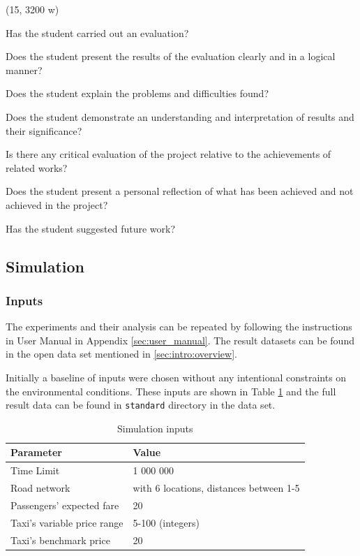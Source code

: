 (15, 3200 w)

Has the student carried out an evaluation?

Does the student present the results of the evaluation clearly and in a logical
manner?

Does the student explain the problems and difficulties found?

Does the student demonstrate an understanding and interpretation of results and
their significance?

Is there any critical evaluation of the project relative to the achievements of
related works?

Does the student present a personal reflection of what has been achieved and
not achieved in the project?

Has the student suggested future work?


\subsection{Simulation}
\label{sec:results}

\subsubsection{Inputs}

The experiments and their analysis can be repeated by following the
instructions in User Manual in Appendix \ref{sec:user_manual}. The result
datasets can be found in the open data set mentioned in
\ref{sec:intro:overview}.

Initially a baseline of inputs were chosen without any intentional constraints
on the environmental conditions. These inputs are shown in Table
\ref{table:input_data} and the full result data can be found in
\texttt{standard} directory in the data set.

\begin{table}
\begin{tabular}{ | l | l | }
  \hline
  Parameter & Value \\ \hline
  Time Limit & 1 000 000 \\
  Road network & with 6 locations, distances between 1-5 \\
  Passengers' expected fare & 20 \\
  Taxi's variable price range & 5-100 (integers) \\
  Taxi's benchmark price & 20 \\
  \hline
\end{tabular}
\caption{
  Simulation inputs
  \label{table:input_data}
}
\end{table}

